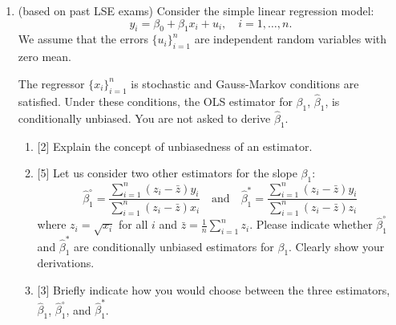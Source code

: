 \documentclass[12pt]{article}
\newcommand{\hb}{\hat{\beta}}
\begin{document}
\begin{enumerate}
    
        




    \item (based on past LSE exams) Consider the simple linear regression model:
    \[
    y_i = \beta_0 + \beta_1 x_i + u_i, \quad i = 1, \dots, n.
    \]
    We assume that the errors $\{u_i\}_{i=1}^n$ are independent random variables with zero mean. 
    
    The regressor $\{x_i\}_{i=1}^n$ is stochastic and Gauss-Markov conditions are satisfied.
    Under these conditions, the OLS estimator for $\beta_1$, $\hb_1$, is conditionally unbiased. 
    You are not asked to derive $\hb_1$.
    
    \begin{enumerate}
        \item {[2]} Explain the concept of unbiasedness of an estimator. 
    
        \item {[5]} Let us consider two other estimators for the slope \(\beta_1\):
        \[
        \hat{\beta}_1^\circ = \frac{\sum_{i=1}^n (z_i - \bar{z}) y_i}{\sum_{i=1}^n (z_i - \bar{z}) x_i} \quad \text{and} \quad
        \hat{\beta}_1^* = \frac{\sum_{i=1}^n (z_i - \bar{z}) y_i}{\sum_{i=1}^n (z_i - \bar{z}) z_i}
        \]
        where \(z_i = \sqrt{x_i}\) for all \(i\) and \(\bar{z} = \frac{1}{n} \sum_{i=1}^n z_i\). 
        Please indicate whether \(\hat{\beta}_1^\circ\) and \(\hat{\beta}_1^*\) are conditionally unbiased estimators for \(\beta_1\). 
        Clearly show your derivations. 
    
        \item {[3]} Briefly indicate how you would choose between the three estimators, \(\hat{\beta}_1\), \(\hat{\beta}_1^\circ\), and \(\hat{\beta}_1^*\). 
    \end{enumerate}

\end{enumerate}
\end{document}
